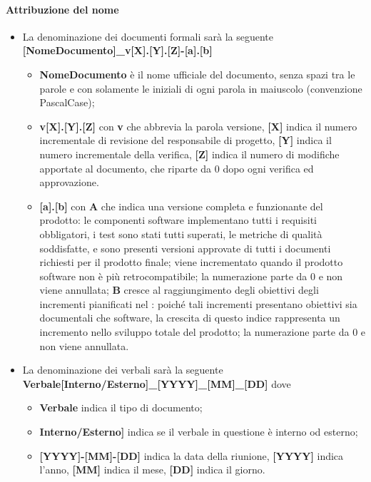 \paragraph{Attribuzione del nome}
\begin{itemize}
	\item La denominazione dei documenti formali sarà la seguente \newline
	\textbf{[NomeDocumento]\_v[X].[Y].[Z]-[a].[b]}
	\begin{itemize}
		\item \textbf{NomeDocumento} è il nome ufficiale del documento, senza spazi tra le parole e con solamente le iniziali di ogni parola in maiuscolo (convenzione PascalCase);
		\item \textbf{v[X].[Y].[Z]} con \textbf{v} che abbrevia la parola versione, \textbf{[X]} indica il numero incrementale di revisione del responsabile di progetto, \textbf{[Y]} indica il numero incrementale della verifica, \textbf{[Z]} indica il numero di modifiche apportate al documento, che riparte da 0 dopo ogni verifica ed approvazione.
		\item \textbf{[a].[b]} con \textbf{A} che indica una versione completa e funzionante del prodotto: le componenti software
implementano tutti i requisiti obbligatori, i test sono stati tutti superati, le metriche
di qualità soddisfatte, e sono presenti versioni approvate di tutti i documenti richiesti
per il prodotto finale; viene incrementato quando il prodotto software non è più
retrocompatibile; la numerazione parte da 0 e non viene annullata; \textbf{B} cresce al raggiungimento degli obiettivi degli incrementi pianificati nel \PdP{}: poiché tali incrementi presentano obiettivi sia documentali che
software, la crescita di questo indice rappresenta un incremento nello sviluppo totale
del prodotto; la numerazione parte da 0 e non viene annullata.
	\end{itemize}
	\item La denominazione dei verbali sarà la seguente\newline
	\textbf{Verbale[Interno/Esterno]\_[YYYY]\_[MM]\_[DD]}\newline
	dove
	\begin{itemize}
		\item \textbf{Verbale} indica il tipo di documento;
		\item \textbf{Interno/Esterno]} indica se il verbale in questione è interno od esterno;
		\item \textbf{[YYYY]-[MM]-[DD]}  indica la data della riunione, \textbf{[YYYY]} indica l'anno, \textbf{[MM]} indica il mese, \textbf{[DD]} indica il giorno.
	\end{itemize}
\end{itemize}

